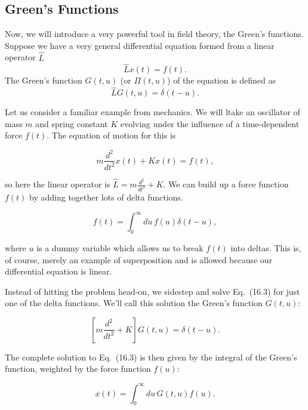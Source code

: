 \documentclass[11pt]{article}
\theoremstyle{definition}
\begin{document}
\subsection{Green's Functions}
Now, we will introduce a very powerful tool in field theory,  the Green's functions. Suppose we have a very general differential equation formed from a linear operator $\hat{L}$
\begin{equation}
    \hat{L}x(t) = f(t).
\end{equation}
The Green's function $G(t, u)$ (or $\Pi(t, u)$) of the equation is defined as
\begin{equation}
    \hat{L}G(t,u) = \delta(t-u).
\end{equation}
\begin{tcolorbox}[breakable, colback=yellow!20!white, colframe=black, boxrule=1pt]
Let us consider a familiar example from mechanics. We will ltake an oscillator of mass $m$ and spring constant $K$ evolving under the influence of a time-dependent force $f(t)$. The equation of motion for this is

\begin{equation}
m\frac{d^{2}}{dt^{2}}x(t) + Kx(t) = f(t), 
\end{equation}

so here the linear operator is $\hat{L} = m\frac{d^{2}}{dt^{2}} + K$. We can build up a force function $f(t)$ by adding together lots of delta functions.

\begin{equation}
f(t) = \int_{0}^{\infty} du\, f(u)\delta(t-u),
\end{equation}

where $u$ is a dummy variable which allows us to break $f(t)$ into deltas. This is, of course, merely an example of superposition and is allowed because our differential equation is linear.

Instead of hitting the problem head-on, we sidestep and solve Eq.~(16.3) for just one of the delta functions. We'll call this solution the Green's function $G(t,u)$:

\begin{equation}
\left[m\frac{d^{2}}{dt^{2}} + K\right]G(t,u) = \delta(t-u).
\end{equation}

The complete solution to Eq.~(16.3) is then given by the integral of the Green's function, weighted by the force function $f(u)$:

\begin{equation}
x(t) = \int_{0}^{\infty} du\, G(t,u)f(u).
\end{equation}


\end{tcolorbox}
\end{document}
